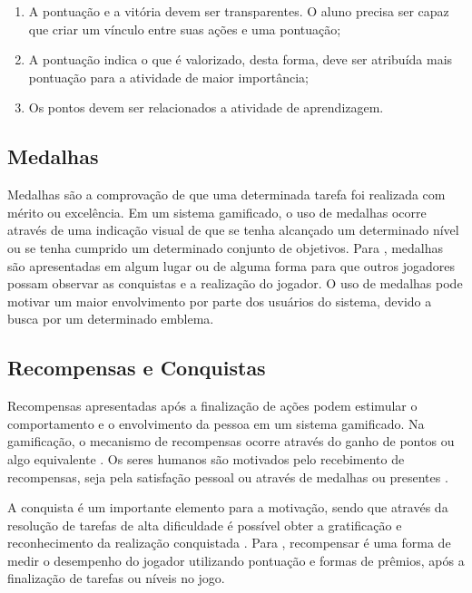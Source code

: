 \documentclass[
	12pt,				%
	oneside,			%
	a4paper,			%
	english,			%
	french,				%
	spanish,			%
	brazil,				%
	]{abntex2}
\begin{document}
\begin{enumerate}
\item A pontuação e a vitória devem ser transparentes. O aluno precisa ser capaz que criar um vínculo entre suas ações e uma pontuação;
\item A pontuação indica o que é valorizado, desta forma, deve ser atribuída mais pontuação para a atividade de maior importância;
\item Os pontos devem ser relacionados a atividade de aprendizagem.
\end{enumerate}

\subsection{Medalhas}

Medalhas são a comprovação de que uma determinada tarefa foi realizada com mérito ou excelência. Em um sistema gamificado, o uso de medalhas ocorre através de uma indicação visual de que se tenha alcançado um determinado nível ou se tenha cumprido um determinado conjunto de objetivos. Para \citet{deterding2011game}, medalhas são apresentadas em algum lugar ou de alguma forma para que outros jogadores possam observar as conquistas e a realização do jogador. O uso de medalhas pode motivar um maior envolvimento por parte dos usuários do sistema, devido a busca por um determinado emblema.
    
\subsection{Recompensas e Conquistas}    

Recompensas apresentadas após a finalização de ações podem estimular o comportamento e o envolvimento da pessoa em um sistema gamificado. Na gamificação, o mecanismo de recompensas ocorre através do ganho de pontos ou algo equivalente \cite{kaap:2014}. Os seres humanos são motivados pelo recebimento de recompensas, seja pela satisfação pessoal ou através de medalhas ou presentes \cite{quadros2016gamificaccao}.

A conquista é um importante elemento para a motivação, sendo que através da resolução de tarefas de alta dificuldade é possível obter a gratificação e reconhecimento da realização conquistada \cite{quadros2016gamificaccao}. Para \citet{busarello2016gamificaccao}, recompensar é uma forma de medir o desempenho do jogador utilizando pontuação e formas de prêmios, após a finalização de tarefas ou níveis no jogo.
\end{document}

